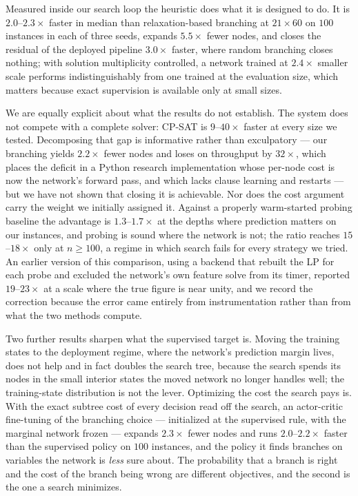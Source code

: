 \documentclass[final,5p,times,twocolumn]{elsarticle}
\begin{document}
Measured inside our search loop the heuristic does what it is designed to do. It is $2.0$--$2.3\times$ faster in median than relaxation-based branching at $21\times60$ on $100$ instances in each of three seeds, expands $5.5\times$ fewer nodes, and closes the residual of the deployed pipeline $3.0\times$ faster, where random branching closes nothing; with solution multiplicity controlled, a network trained at $2.4\times$ smaller scale performs indistinguishably from one trained at the evaluation size, which matters because exact supervision is available only at small sizes.

We are equally explicit about what the results do not establish. The system does not compete with a complete solver: CP-SAT is $9$--$40\times$ faster at every size we tested. Decomposing that gap is informative rather than exculpatory --- our branching yields $2.2\times$ fewer nodes and loses on throughput by $32\times$, which places the deficit in a Python research implementation whose per-node cost is now the network's forward pass, and which lacks clause learning and restarts --- but we have not shown that closing it is achievable. Nor does the cost argument carry the weight we initially assigned it. Against a properly warm-started probing baseline the advantage is $1.3$--$1.7\times$ at the depths where prediction matters on our instances, and probing is sound where the network is not; the ratio reaches $15$--$18\times$ only at $n\ge100$, a regime in which search fails for every strategy we tried. An earlier version of this comparison, using a backend that rebuilt the LP for each probe and excluded the network's own feature solve from its timer, reported $19$--$23\times$ at a scale where the true figure is near unity, and we record the correction because the error came entirely from instrumentation rather than from what the two methods compute.

Two further results sharpen what the supervised target is. Moving the training states to the deployment regime, where the network's prediction margin lives, does not help and in fact doubles the search tree, because the search spends its nodes in the small interior states the moved network no longer handles well; the training-state distribution is not the lever. Optimizing the cost the search pays is. With the exact subtree cost of every decision read off the search, an actor-critic fine-tuning of the branching choice --- initialized at the supervised rule, with the marginal network frozen --- expands $2.3\times$ fewer nodes and runs $2.0$--$2.2\times$ faster than the supervised policy on $100$ instances, and the policy it finds branches on variables the network is \emph{less} sure about. The probability that a branch is right and the cost of the branch being wrong are different objectives, and the second is the one a search minimizes.
\end{document}
